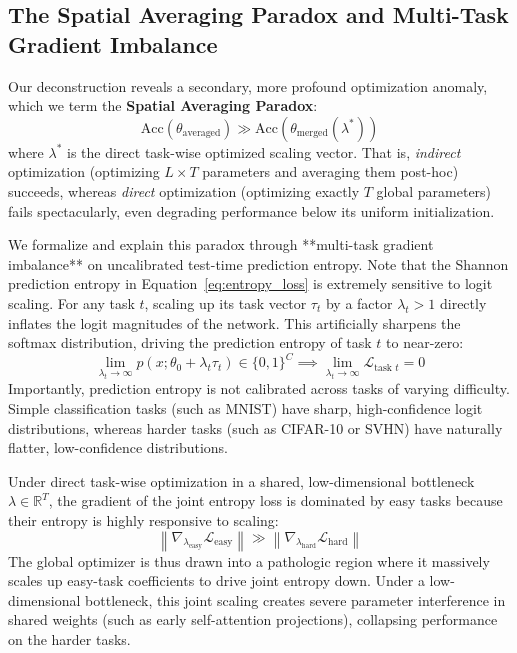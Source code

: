 \subsection{The Spatial Averaging Paradox and Multi-Task Gradient Imbalance}
Our deconstruction reveals a secondary, more profound optimization anomaly, which we term the \textbf{Spatial Averaging Paradox}:
\begin{equation}
\text{Acc}\left(\theta_{\text{averaged}}\right) \gg \text{Acc}\left(\theta_{\text{merged}}(\lambda^*)\right)
\end{equation}
where $\lambda^*$ is the direct task-wise optimized scaling vector. That is, \emph{indirect} optimization (optimizing $L \times T$ parameters and averaging them post-hoc) succeeds, whereas \emph{direct} optimization (optimizing exactly $T$ global parameters) fails spectacularly, even degrading performance below its uniform initialization.

We formalize and explain this paradox through **multi-task gradient imbalance** on uncalibrated test-time prediction entropy. Note that the Shannon prediction entropy in Equation~\ref{eq:entropy_loss} is extremely sensitive to logit scaling. For any task $t$, scaling up its task vector $\tau_t$ by a factor $\lambda_t > 1$ directly inflates the logit magnitudes of the network. This artificially sharpens the softmax distribution, driving the prediction entropy of task $t$ to near-zero:
\begin{equation}
\lim_{\lambda_t \to \infty} p\left(x; \theta_0 + \lambda_t \tau_t\right) \in \{0, 1\}^C \implies \lim_{\lambda_t \to \infty} \mathcal{L}_{\text{task } t} = 0
\end{equation}
Importantly, prediction entropy is not calibrated across tasks of varying difficulty. Simple classification tasks (such as MNIST) have sharp, high-confidence logit distributions, whereas harder tasks (such as CIFAR-10 or SVHN) have naturally flatter, low-confidence distributions. 

Under direct task-wise optimization in a shared, low-dimensional bottleneck $\lambda \in \mathbb{R}^T$, the gradient of the joint entropy loss is dominated by easy tasks because their entropy is highly responsive to scaling:
\begin{equation}
\left\| \nabla_{\lambda_{\text{easy}}} \mathcal{L}_{\text{easy}} \right\| \gg \left\| \nabla_{\lambda_{\text{hard}}} \mathcal{L}_{\text{hard}} \right\|
\end{equation}
The global optimizer is thus drawn into a pathologic region where it massively scales up easy-task coefficients to drive joint entropy down. Under a low-dimensional bottleneck, this joint scaling creates severe parameter interference in shared weights (such as early self-attention projections), collapsing performance on the harder tasks.

